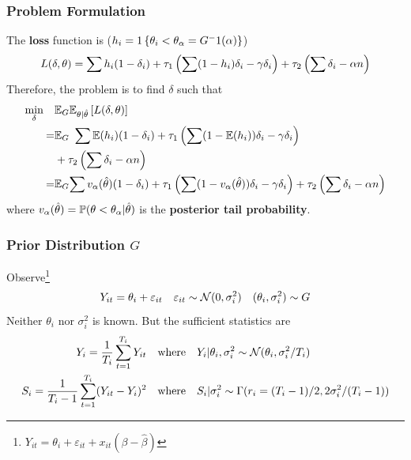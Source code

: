\documentclass[10pt,mathserif,aspectratio=169]{beamer}
\begin{document}
\begin{frame}
  \frametitle{Problem Formulation}
  The \textbf{loss} function is ($h_i=1\left\{\theta_i<\theta_{\alpha}=G^-1(\alpha)\right\}$)
  \begin{equation*}
    L(\delta,\theta)=\sum h_i(1-\delta_i) +\tau_1\left(\sum (1-h_i)\delta_i -\gamma \delta_i\right) + \tau_2 \left(\sum \delta_i -\alpha n\right)
  \end{equation*}
  Therefore, the problem is to find $\delta$ such that
  \begin{align*}
    \min_{\delta} \quad & \mathbb{E}_G\mathbb{E}_{\theta|\hat{\theta}}\left[L(\delta,\theta)\right]                                                                                                       \\
    =                   & \mathbb{E}_G \ \sum \mathbb{E}(h_i)(1-\delta_i) +\tau_1\left(\sum (1-\mathbb{E}(h_i))\delta_i -\gamma \delta_i\right)                                                                    \\
                        & + \tau_2 \left(\sum \delta_i -\alpha n\right)                                                                                                                    \\
    =                   & \mathbb{E}_G{\sum v_\alpha(\hat{\theta})(1-\delta_i) +\tau_1\left(\sum (1-v_\alpha(\hat{\theta}))\delta_i -\gamma \delta_i\right) + \tau_2 \left(\sum \delta_i -\alpha n\right)}
  \end{align*} where $v_\alpha(\hat{\theta})=\mathbb{P}(\theta<\theta_\alpha|\hat{\theta})$ is the \textbf{posterior tail probability}.
\end{frame}

\begin{frame}[label=observation]
  \frametitle{Prior Distribution $G$}
  Observe\footnote{$Y_{it}=\theta_i+\varepsilon_{it}+x_{it}(\beta-\hat{\beta})$}
  \begin{equation*}
    Y_{it} = \theta_i + \varepsilon_{it} \quad \varepsilon_{it} \sim \mathcal{N}(0,\sigma_i^2) \quad (\theta_i,\sigma_i^2) \sim G
  \end{equation*}
  Neither $\theta_i$ nor $\sigma_i^2$ is known. But the sufficient statistics are
  \begin{align*}
    Y_i=\frac{1}{T_i}\sum_{t=1}^{T_i}Y_{it}           & \quad \text{where}\quad Y_i|\theta_i,\sigma_i^2 \sim \mathcal{N}(\theta_i,\sigma_i^2/T_i)     \\
    S_i=\frac{1}{T_i-1}\sum_{t=1}^{T_i}(Y_{it}-Y_i)^2 & \quad \text{where} \quad S_i|\sigma_i^2 \sim \Gamma(r_i= (T_i-1)/2,2\sigma_i^2/(T_i-1))
  \end{align*}
  \hyperlink{normality}{}
\end{frame}
\end{document}
